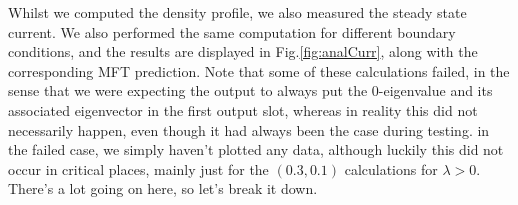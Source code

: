  Whilst we computed the density profile, we also measured the steady state current. We also performed the
 same computation for different boundary conditions, and the results are displayed in Fig.\ref{fig:analCurr},
 along with the corresponding MFT prediction. Note that some of these calculations failed, in the sense that
 we were expecting the output to always put the $0$-eigenvalue and its associated eigenvector in the
 first output slot, whereas in reality this did not necessarily happen, even though it had always been the
 case during testing. in the failed case, we simply haven't plotted any data, although luckily this did not
 occur in critical places, mainly just for the $(0.3, 0.1)$ calculations for $\lambda>0$.
There's a lot going on here, so let's break it down.
